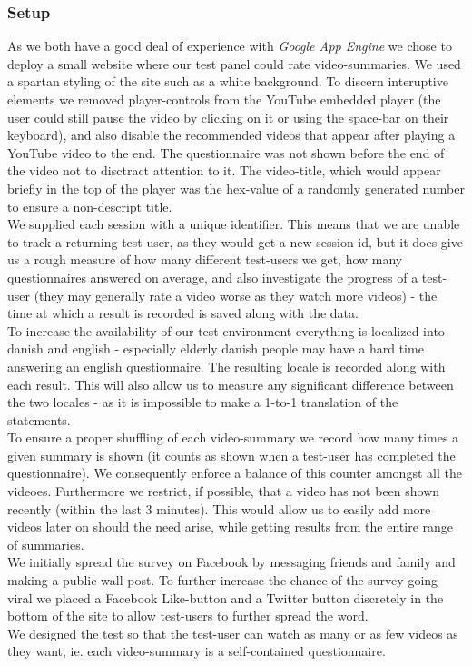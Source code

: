 \subsubsection{Setup}
%
As we both have a good deal of experience with \textit{Google App Engine} we chose to deploy a small website where our test panel could rate video-summaries. We used a spartan styling of the site such as a white background. To discern interuptive elements we removed player-controls from the YouTube embedded player (the user could still pause the video by clicking on it or using the space-bar on their keyboard), and also disable the recommended videos that appear after playing a YouTube video to the end. The questionnaire was not shown before the end of the video not to disctract attention to it. The video-title, which would appear briefly in the top of the player was the hex-value of a randomly generated number to ensure a non-descript title.\\
We supplied each session with a unique identifier. This means that we are unable to track a returning test-user, as they would get a new session id, but it does give us a rough measure of how many different test-users we get, how many questionnaires answered on average, and also investigate the progress of a test-user (they may generally rate a video worse as they watch more videos) - the time at which a result is recorded is saved along with the data.\\
To increase the availability of our test environment everything is localized into danish and english - especially elderly danish people may have a hard time answering an english questionnaire. The resulting locale is recorded along with each result. This will also allow us to measure any significant difference between the two locales - as it is impossible to make a 1-to-1 translation of the statements.\\
To ensure a proper shuffling of each video-summary we record how many times a given summary is shown (it counts as shown when a test-user has completed the questionnaire). We consequently enforce a balance of this counter amongst all the videoes. Furthermore we restrict, if possible, that a video has not been shown recently (within the last 3 minutes). This would allow us to easily add more videos later on should the need arise, while getting results from the entire range of summaries.\\
We initially spread the survey on Facebook by messaging friends and family and making a public wall post. To further increase the chance of the survey going viral we placed a Facebook Like-button and a Twitter button discretely in the bottom of the site to allow test-users to further spread the word.\\
We designed the test so that the test-user can watch as many or as few videos as they want, ie. each video-summary is a self-contained questionnaire.
%
